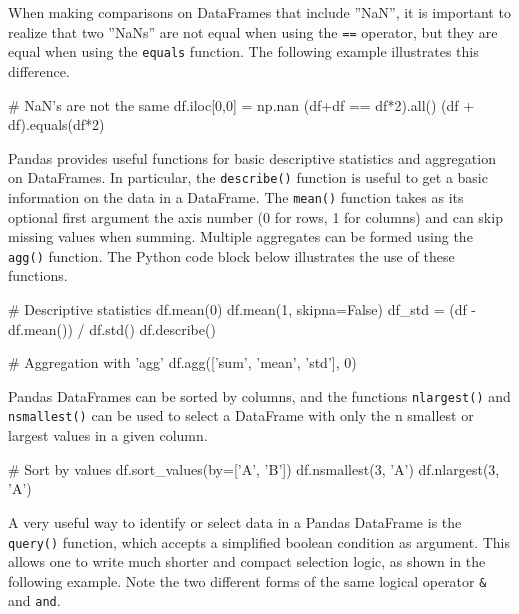 When making comparisons on DataFrames that include ''NaN'', it is important to realize that two ''NaNs'' are not equal when using the \texttt{==} operator, but they are equal when using the \texttt{equals} function. The following example illustrates this difference.

\begin{samepage}
\begin{pythoncode}
# NaN's are not the same
df.iloc[0,0] = np.nan
(df+df == df*2).all()
(df + df).equals(df*2)
\end{pythoncode}
\end{samepage}

Pandas provides useful functions for basic descriptive statistics and aggregation on DataFrames. In particular, the \texttt{describe()} function is useful to get a basic information on the data in a DataFrame. The \texttt{mean()} function takes as its optional first argument the axis number (0 for rows, 1 for columns) and can skip missing values when summing. Multiple aggregates can be formed using the \texttt{agg()} function. The Python code block below illustrates the use of these functions.

\begin{samepage}
\begin{pythoncode}
# Descriptive statistics
df.mean(0)
df.mean(1, skipna=False)
df_std = (df - df.mean()) / df.std()
df.describe()

# Aggregation with 'agg'
df.agg(['sum', 'mean', 'std'], 0)
\end{pythoncode}
\end{samepage}

Pandas DataFrames can be sorted by columns, and the functions \texttt{nlargest()} and \texttt{nsmallest()} can be used to select a DataFrame with only the n smallest or largest values in a given column.

\begin{samepage}
\begin{pythoncode}
# Sort by values
df.sort_values(by=['A', 'B'])
df.nsmallest(3, 'A')
df.nlargest(3, 'A')
\end{pythoncode}
\end{samepage}

A very useful way to identify or select data in a Pandas DataFrame is the \texttt{query()} function, which accepts a simplified boolean condition as argument. This allows one to write much shorter and compact selection logic, as shown in the following example. Note the two different forms of the same logical operator \texttt{\&} and \texttt{and}.

